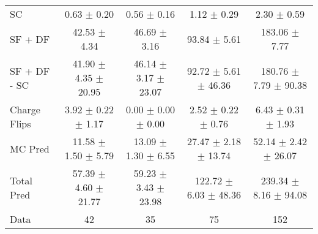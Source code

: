 \begin{tabular}{l|cccc}
                                 SC &  0.63 $\pm$  0.20 &  0.56 $\pm$  0.16 &  1.12 $\pm$  0.29 &  2.30 $\pm$  0.59 \\
                            SF + DF & 42.53 $\pm$  4.34 & 46.69 $\pm$  3.16 & 93.84 $\pm$  5.61 & 183.06 $\pm$  7.77 \\
\hline
                       SF + DF - SC & 41.90 $\pm$  4.35 $\pm$ 20.95 & 46.14 $\pm$  3.17 $\pm$ 23.07 & 92.72 $\pm$  5.61 $\pm$ 46.36 & 180.76 $\pm$  7.79 $\pm$ 90.38 \\
\hline\hline
                       Charge Flips &  3.92 $\pm$  0.22 $\pm$  1.17 &  0.00 $\pm$  0.00 $\pm$  0.00 &  2.52 $\pm$  0.22 $\pm$  0.76 &  6.43 $\pm$  0.31 $\pm$  1.93 \\
\hline
                            MC Pred & 11.58 $\pm$  1.50 $\pm$  5.79 & 13.09 $\pm$  1.30 $\pm$  6.55 & 27.47 $\pm$  2.18 $\pm$ 13.74 & 52.14 $\pm$  2.42 $\pm$ 26.07 \\
\hline
                         Total Pred & 57.39 $\pm$  4.60 $\pm$ 21.77 & 59.23 $\pm$  3.43 $\pm$ 23.98 & 122.72 $\pm$  6.03 $\pm$ 48.36 & 239.34 $\pm$  8.16 $\pm$ 94.08 \\
\hline\hline
                               Data &    42 &    35 &    75 &   152 \\
\hline\hline
\end{tabular}

